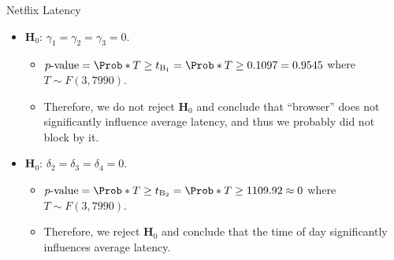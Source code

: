 \begin{Example}{Netflix Latency}{}
\begin{itemize}
\begin{itemize}
              \end{itemize}
        \item $ \mathbf{H}_0 $: $ \gamma_1=\gamma_2=\gamma_3=0 $.
              \begin{itemize}
                  \item $ p\text{-value}=\Prob*{T\ge t_{\text{B}_1}}=\Prob*{T\ge 0.1097}=0.9545 $ where $ T \sim F(3,7990) $.
                  \item Therefore, we do not reject $ \mathbf{H}_0 $ and conclude that ``browser'' does not
                        significantly influence average latency, and thus we probably did not block by it.
              \end{itemize}
        \item $ \mathbf{H}_0 $: $ \delta_2=\delta_3=\delta_4=0 $.
              \begin{itemize}
                  \item $ p\text{-value}=\Prob*{T\ge t_{\text{B}_2}}=\Prob*{T\ge 1109.92}\approx 0 $ where $ T \sim F(3,7990) $.
                  \item Therefore, we reject $ \mathbf{H}_0 $ and conclude that the time of day significantly influences average latency.
              \end{itemize}
    \end{itemize}
\end{Example}
